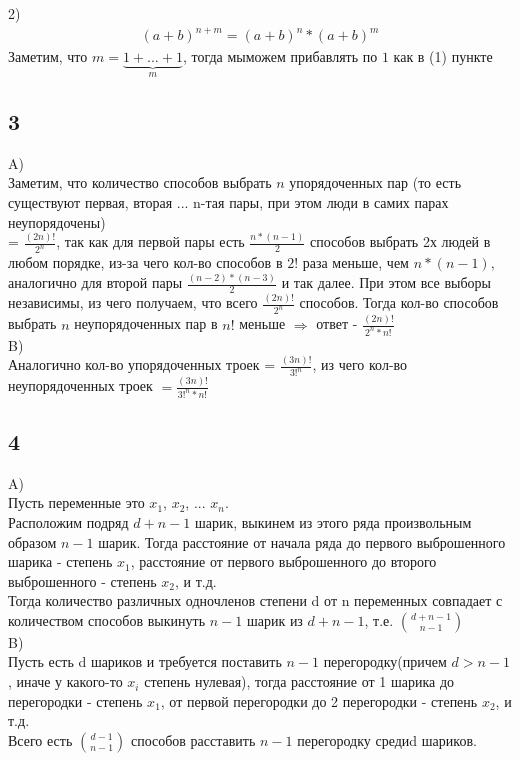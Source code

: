		2)\\
		\begin{gather*}
		(a + b)^{n+m} = (a + b)^{n} * (a + b) ^{m}
		\end{gather*}
		Заметим, что $m = \underbrace{1 + ... + 1}_m$, тогда мыможем прибавлять по $1$ как в (1) пункте
		
		\subsection{3}
		A)\\
		Заметим, что количество способов выбрать $n$ упорядоченных пар (то есть существуют первая, вторая ... n-тая пары, при этом люди в самих парах неупорядочены)\\
		= $\frac{(2n)!}{2^n}$, так как для первой пары есть $\frac{n*(n-1)}{2}$ способов выбрать 2х людей в любом порядке, из-за чего кол-во способов в $2!$ раза меньше, чем $n*(n-1)$, аналогично для второй пары $\frac{(n-2)*(n-3)}{2}$ и так далее. При этом все выборы независимы, из чего получаем, что всего $\frac{(2n)!}{2^n}$ способов. Тогда кол-во способов выбрать $n$ неупорядоченных пар в $n!$ меньше $\Longrightarrow$ ответ - $\frac{(2n)!}{2^n * n!}$\\
		
		B)\\
		Аналогично кол-во упорядоченных троек =  $\frac{(3n)!}{3!^n}$, из чего кол-во неупорядоченных троек $= \frac{(3n)!}{3!^n * n!}$
		
		\subsection{4}
		A)\\
		Пусть переменные это $x_1$, $x_2$, ... $x_n$.\\
		Расположим подряд $d + n - 1$ шарик, выкинем из этого ряда произвольным образом $n-1$ шарик. Тогда расстояние от начала ряда до первого выброшенного шарика - степень $x_1$, расстояние от первого выброшенного до второго выброшенного - степень $x_2$, и т.д.\\
		Тогда количество различных одночленов степени d от n переменных совпадает с количеством способов выкинуть $n-1$ шарик из $d + n - 1$, т.е. ${{d + n - 1} \choose {n-1}}$
		\\
		B)\\
		Пусть есть d шариков и требуется поставить $n-1$ перегородку(причем $d > n-1$, иначе у какого-то $x_i$ степень нулевая), тогда расстояние от 1 шарика до перегородки - степень $x_1$, от первой перегородки до 2 перегородки - степень $x_2$, и т.д.\\
		Всего есть ${{d-1}\choose{n-1}}$ способов расставить $n-1$ перегородку средиd шариков. 
		
